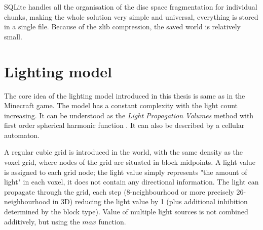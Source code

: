 
SQLite handles all the organisation of the disc space fragmentation for individual chunks, making the whole solution very simple and universal, everything is stored in a single file. Because of the zlib compression, the saved world is relatively small.

\section{Lighting model} \label{lightingModel}
The core idea of the lighting model introduced in this thesis is same as in the Minecraft game. The model has a constant complexity with the light count increasing. It can be understood as the \textit{Light Propagation Volumes} method with first order spherical harmonic function \cite{MartinTimothyLy2012Holp}. It can also be described by a cellular automaton.

A regular cubic grid is introduced in the world, with the same density as the voxel grid, where nodes of the grid are situated in block midpoints. A light value is assigned to each grid node; the light value simply represents "the amount of light" in each voxel, it does not contain any directional information. The light can propagate through the grid, each step (8-neighbourhood or more precisely 26-neighbourhood in 3D) reducing the light value by 1 (plus additional inhibition determined by the block type). Value of multiple light sources is not combined additively, but using the $max$ function.

